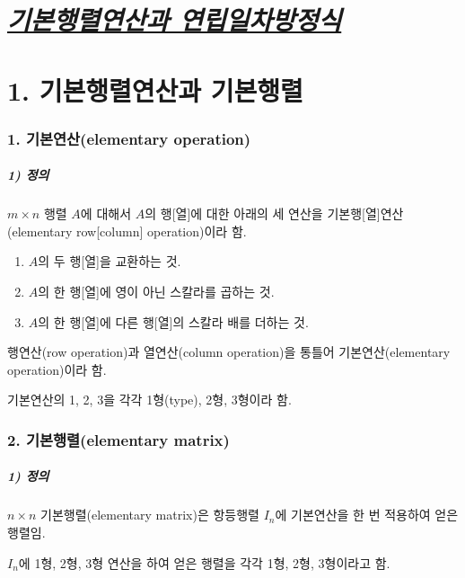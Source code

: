 \part{\textit{\underline{기본행렬연산과 연립일차방정식}}}
\part*{1. 기본행렬연산과 기본행렬}

\section*{1. 기본연산(elementary operation)}

\subsubsection*{1) 정의\\}
\begin{DEF}
$m \times n$ 행렬 $A$에 대해서 $A$의 행[열]에 대한 아래의 세 연산을 기본행[열]연산(elementary row[column] operation)이라 함.

\begin{enumerate}
    \item $A$의 두 행[열]을 교환하는 것.
    \item $A$의 한 행[열]에 영이 아닌 스칼라를 곱하는 것.
    \item $A$의 한 행[열]에 다른 행[열]의 스칼라 배를 더하는 것.
\end{enumerate}

행연산(row operation)과 열연산(column operation)을 통틀어 기본연산(elementary operation)이라 함.

기본연산의 1, 2, 3을 각각 1형(type), 2형, 3형이라 함.
\end{DEF}

\section*{2. 기본행렬(elementary matrix)}

\subsubsection*{1) 정의\\}
\begin{DEF}
$n \times n$ 기본행렬(elementary matrix)은 항등행렬 $I_n$에 기본연산을 한 번 적용하여 얻은 행렬임.

$I_n$에 1형, 2형, 3형 연산을 하여 얻은 행렬을 각각 1형, 2형, 3형이라고 함.
\end{DEF}

